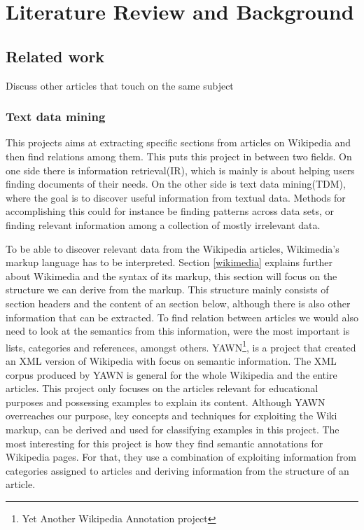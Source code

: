 
\chapter{Literature Review and Background}


\section{Related work}
Discuss other articles that touch on the same subject

\subsection{Text data mining} \label{sec_tdm}
This projects aims at extracting specific sections from articles on Wikipedia and then find relations among them. This puts this project in between two fields. On one side there is information retrieval(IR), which is mainly is about helping users finding documents of their needs\cite{irbook}. On the other side is text data mining(TDM), where the goal is to discover useful information from textual data. Methods for accomplishing this could for instance be finding patterns across data sets, or finding relevant information among a collection of mostly irrelevant data\cite{untanglingTDM}.

To be able to discover relevant data from the Wikipedia articles, Wikimedia's markup language has to be interpreted. Section \ref{wikimedia} explains further about Wikimedia and the syntax of its markup, this section will focus on the structure we can derive from the markup. This structure mainly consists of section headers and the content of an section below, although there is also other information that can be extracted. To find relation between articles we would also need to look at the semantics from this information, were the most important is lists, categories and references, amongst others. YAWN\footnote{Yet Another Wikipedia Annotation project}, is a project that created an XML version of Wikipedia with focus on semantic information\cite{yawn}. The XML corpus produced by YAWN is general for the whole Wikipedia and the entire articles. This project only focuses on the articles relevant for educational purposes and possessing examples to explain its content. Although YAWN overreaches our purpose, key concepts and techniques for exploiting the Wiki markup, can be derived and used for classifying examples in this project. The most interesting for this project is how they find semantic annotations for Wikipedia pages. For that, they use a combination of exploiting information from categories assigned to articles and deriving information from the structure of an article.

